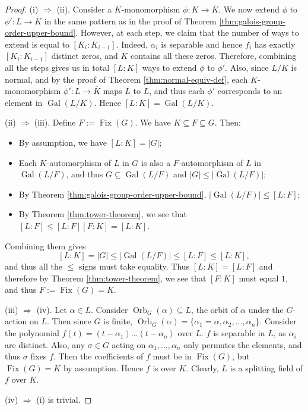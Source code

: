 \documentclass[12pt]{article}
\theoremstyle{definition}
\newcommand{\Gal}{\operatorname{Gal}}
\newcommand{\Fix}{\operatorname{Fix}}
\newcommand{\Orb}{\operatorname{Orb}}
\begin{document}
\begin{proof}
	
	
	
	(i) $\Rightarrow$ (ii). Consider a $K$-monomorphism $\phi: K \to \overline{K}$. We now extend $\phi$ to $\phi':L \to \overline{K}$ in the same pattern as in the proof of Theorem \ref{thm:galois-group-order-upper-bound}. However, at each step, we claim that the number of ways to extend is equal to $[K_i : K_{i-1}]$. Indeed, $\alpha_i$ is separable and hence $f_i$ has exactly $[K_i : K_{i-1}]$ distinct zeros, and $\overline K$ contains all these zeros. Therefore, combining all the steps gives us in total $[L:K]$ ways to extend $\phi$ to $\phi'$. Also, since $L/K$ is normal, and by the proof of Theorem \ref{thm:normal-equiv-def}, each $K$-monomorphism $\phi': L \to \overline{K}$ maps $L$ to $L$, and thus each $\phi'$ corresponds to an element in $\Gal(L/K)$. Hence $[L:K] = \Gal(L/K)$. 
	
	(ii) $\Rightarrow$ (iii). Define $F:= \Fix(G)$. We have $K \subseteq F \subseteq G$. Then:
	\begin{itemize}
		\item By assumption, we have $[L:K] = |G|$;
		\item     Each $K$-automorphism of $L$ in $G$ is also a $F$-automorphism of $L$ in $\Gal(L/F)$, and thus $G \subseteq \Gal(L / F)$ and $|G| \le |\Gal(L / F)|$;
		\item  By Theorem \ref{thm:galois-group-order-upper-bound}, $|\Gal(L/F)| \le [L:F]$;
		
		\item     By Theorem \ref{thm:tower-theorem}, we see that $ [L:F] \le [L:F][F:K] = [L:K]$.
	\end{itemize}
	
	Combining them gives $$
	[L:K] = |G| \le |\Gal(L/F)| \le  [L:F] \le [L:K],
	$$    
	and thus all the $\le$ signs must take equality.  
	Thus $[L:K]=[L:F]$ and therefore by Theorem \ref{thm:tower-theorem}, we see that $[F:K]$ must equal $1$, and thus $F:=\Fix(G) = K$.
	
	(iii) $\Rightarrow$ (iv). Let $\alpha \in L$. Consider $\Orb_G(\alpha) \subseteq L$, the orbit of $\alpha$ under the $G$-action on $L$. Then since $G$ is finite, $\Orb_G(\alpha) = \{ \alpha_1 = \alpha, \alpha_2, \ldots, \alpha_n\}$. Consider the polynomial $f(t) = (t-\alpha_1) \ldots (t-\alpha_n)$ over $L$.  $f$ is separable in $L$, as $\alpha_i$ are distinct. Also, any $\sigma \in G$ acting on $\alpha_1, \dots, \alpha_n$ only permutes the elements, and thus $\sigma$ fixes $f$. Then the coefficients of $f$ must be in $\Fix(G)$, but $\Fix(G) = K$ by assumption. Hence $f$ is over $K$. Clearly, $L$ is a splitting field of $f$ over $K$. 
	
	(iv) $\Rightarrow$ (i) is trivial.
	
\end{proof}
\end{document}
